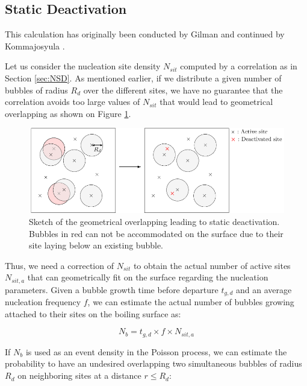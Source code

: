 \subsection{Static Deactivation}

\begin{note*}{}
This calculation has originally been conducted by Gilman \cite{gilman_self-consistent_2017} and continued by Kommajosyula \cite{kommajosyula_development_2020}. 
\end{note*}


Let us consider the nucleation site density $N_{sit}$ computed by a correlation as in Section \ref{sec:NSD}. As mentioned earlier, if we distribute a given number of bubbles of radius $R_{d}$ over the different sites, we have no guarantee that the correlation avoids too large values of $N_{sit}$ that would lead to geometrical overlapping as shown on Figure \ref{fig:static_deactivation}.

\begin{figure}[!h]
\centering
\includegraphics[width=0.9\linewidth]{img/site_interaction/static_suppression.pdf}
\caption{Sketch of the geometrical overlapping leading to static deactivation. Bubbles in red can not be accommodated on the surface due to their site laying below an existing bubble.}
\label{fig:static_deactivation}
\end{figure}


Thus, we need a correction of $N_{sit}$ to obtain the actual number of active sites $N_{sit,a}$ that can geometrically fit on the surface regarding the nucleation parameters. Given a bubble growth time before departure $t_{g,d}$ and an average nucleation frequency $f$, we can estimate the actual number of bubbles growing attached to their sites on the boiling surface as:

\begin{equation}
N_{b} = t_{g,d}\times f \times N_{sit,a}
\label{eq:bubble_density}
\end{equation}


If $N_{b}$ is used as an event density in the Poisson process, we can estimate the probability to have an undesired overlapping \ie two simultaneous bubbles of radius $R_{d}$ on neighboring sites at a distance $r\leq R_{d}$:

